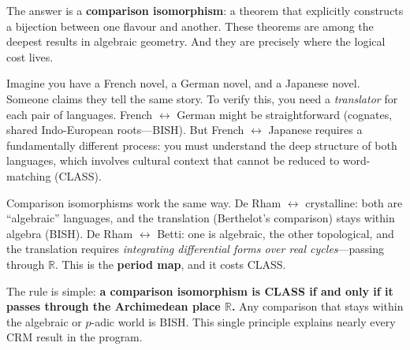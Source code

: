 \documentclass[11pt,twoside,openany]{report}
\theoremstyle{remark}
\newcommand{\BISH}{\textsf{BISH}}
\newcommand{\CLASS}{\textsf{CLASS}}
\begin{document}
The answer is a \textbf{comparison isomorphism}: a theorem that explicitly constructs a bijection between one flavour and another. These theorems are among the deepest results in algebraic geometry. And they are precisely where the logical cost lives.

\begin{analogybox}
Imagine you have a French novel, a German novel, and a Japanese novel. Someone claims they tell the same story. To verify this, you need a \emph{translator} for each pair of languages. French $\leftrightarrow$ German might be straightforward (cognates, shared Indo-European roots---\BISH). But French $\leftrightarrow$ Japanese requires a fundamentally different process: you must understand the deep structure of both languages, which involves cultural context that cannot be reduced to word-matching (\CLASS).

Comparison isomorphisms work the same way. De Rham $\leftrightarrow$ crystalline: both are ``algebraic'' languages, and the translation (Berthelot's comparison) stays within algebra (\BISH). De Rham $\leftrightarrow$ Betti: one is algebraic, the other topological, and the translation requires \emph{integrating differential forms over real cycles}---passing through $\mathbb{R}$. This is the \textbf{period map}, and it costs \CLASS.
\end{analogybox}

The rule is simple: \textbf{a comparison isomorphism is \CLASS{} if and only if it passes through the Archimedean place $\mathbb{R}$.} Any comparison that stays within the algebraic or $p$-adic world is \BISH. This single principle explains nearly every CRM result in the program.
\end{document}
